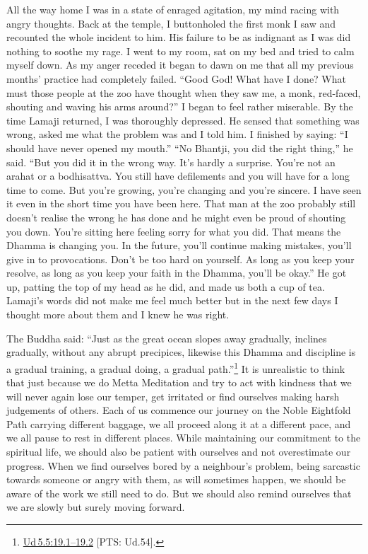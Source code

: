 \documentclass[10pt, openright]{book}
\begin{document}
All the way home I was in a state of enraged agitation, my mind racing with angry thoughts. Back at the temple, I buttonholed the first monk I saw and recounted the whole incident to him. His failure to be as indignant as I was did nothing to soothe my rage. I went to my room, sat on my bed and tried to calm myself down. As my anger receded it began to dawn on me that all my previous months’ practice had completely failed. “Good God! What have I done? What must those people at the zoo have thought when they saw me, a monk, red-faced, shouting and waving his arms around?” I began to feel rather miserable. By the time Lamaji returned, I was thoroughly depressed. He sensed that something was wrong, asked me what the problem was and I told him. I finished by saying: “I should have never opened my mouth.” “No Bhantji, you did the right thing,” he said. “But you did it in the wrong way. It’s hardly a surprise. You’re not an arahat or a bodhisattva. You still have defilements and you will have for a long time to come. But you’re growing, you’re changing and you’re sincere. I have seen it even in the short time you have been here. That man at the zoo probably still doesn’t realise the wrong he has done and he might even be proud of shouting you down. You’re sitting here feeling sorry for what you did. That means the Dhamma is changing you. In the future, you’ll continue making mistakes, you’ll give in to provocations. Don’t be too hard on yourself. As long as you keep your resolve, as long as you keep your faith in the Dhamma, you’ll be okay.” He got up, patting the top of my head as he did, and made us both a cup of tea. Lamaji’s words did not make me feel much better but in the next few days I thought more about them and I knew he was right.


The Buddha said: “Just as the great ocean slopes away gradually, inclines gradually, without any abrupt precipices, likewise this Dhamma and discipline is a gradual training, a gradual doing, a gradual path.”\footnote {\href{https://suttacentral.net/ud5.5/en/sujato\#19.1}{Ud 5.5:19.1–19.2} [PTS: Ud.54].} It is unrealistic to think that just because we do Metta Meditation and try to act with kindness that we will never again lose our temper, get irritated or find ourselves making harsh judgements of others. Each of us commence our journey on the Noble Eightfold Path carrying different baggage, we all proceed along it at a different pace, and we all pause to rest in different places. While maintaining our commitment to the spiritual life, we should also be patient with ourselves and not overestimate our progress. When we find ourselves bored by a neighbour’s problem, being sarcastic towards someone or angry with them, as will sometimes happen, we should be aware of the work we still need to do. But we should also remind ourselves that we are slowly but surely moving forward.
\end{document}
